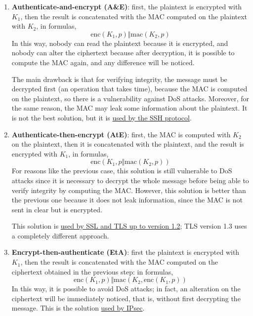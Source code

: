 \begin{enumerate}
    \item \textbf{Authenticate-and-encrypt (A\&E)}: first, the plaintext is encrypted with \(K_1\), then the result is concatenated with the MAC computed on the plaintext with \(K_2\), in formulas, \[\text{enc}(K_1, p)\Vert  \text{mac}(K_2, p)\]
          In this way, nobody can read the plaintext because it is encrypted, and nobody can alter the ciphertext because after decryption, it is possible to compute the MAC again, and any difference will be noticed.

          The main drawback is that for verifying integrity, the message must be decrypted first (an operation that takes time), because the MAC is computed on the plaintext, so there is a vulnerability against DoS attacks. Moreover, for the same reason, the MAC may leak some information about the plaintext. It is not the best solution, but it is \ul{used by the SSH protocol}.

    \item \textbf{Authenticate-then-encrypt (AtE)}: first, the MAC is computed with \(K_2\) on the plaintext, then it is concatenated with the plaintext, and the result is encrypted with \(K_1\), in formulas, \[\text{enc}(K_1, p \Vert \text{mac}(K_2, p))\]
          For reasons like the previous case, this solution is still vulnerable to DoS attacks since it is necessary to decrypt the whole message before being able to verify integrity by computing the MAC. However, this solution is better than the previous one because it does not leak information, since the MAC is not sent in clear but is encrypted.

          This solution is \underline{used by SSL and TLS up to version 1.2}; TLS version 1.3 uses a completely different approach.

    \item \textbf{Encrypt-then-authenticate (EtA)}: first the plaintext is encrypted with \(K_1\), then the result is
          concatenated with the MAC computed on the ciphertext obtained in the previous step: in formulas,
          \[\text{enc}(K_1, p) \Vert \text{mac}(K_2, \text{enc}(K_1, p))\]
          In this way, it is possible to avoid DoS attacks; in fact, an alteration on the ciphertext will be immediately noticed, that is, without first decrypting the message.
          This is the solution \underline{used by IPsec}.
\end{enumerate}

